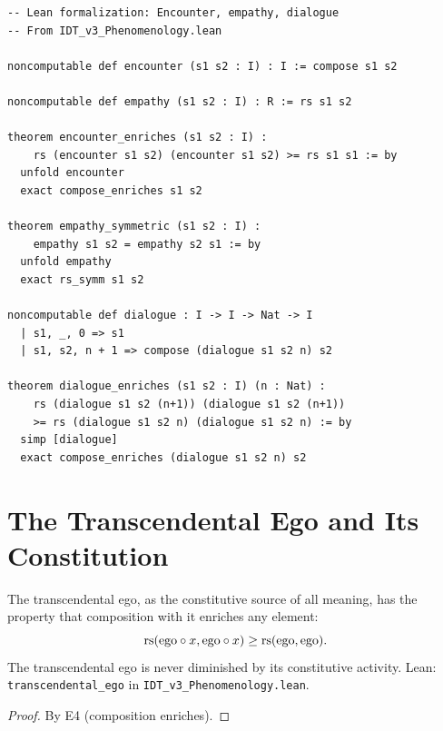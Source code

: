 \begin{lstlisting}
-- Lean formalization: Encounter, empathy, dialogue
-- From IDT_v3_Phenomenology.lean

noncomputable def encounter (s1 s2 : I) : I := compose s1 s2

noncomputable def empathy (s1 s2 : I) : R := rs s1 s2

theorem encounter_enriches (s1 s2 : I) :
    rs (encounter s1 s2) (encounter s1 s2) >= rs s1 s1 := by
  unfold encounter
  exact compose_enriches s1 s2

theorem empathy_symmetric (s1 s2 : I) :
    empathy s1 s2 = empathy s2 s1 := by
  unfold empathy
  exact rs_symm s1 s2

noncomputable def dialogue : I -> I -> Nat -> I
  | s1, _, 0 => s1
  | s1, s2, n + 1 => compose (dialogue s1 s2 n) s2

theorem dialogue_enriches (s1 s2 : I) (n : Nat) :
    rs (dialogue s1 s2 (n+1)) (dialogue s1 s2 (n+1))
    >= rs (dialogue s1 s2 n) (dialogue s1 s2 n) := by
  simp [dialogue]
  exact compose_enriches (dialogue s1 s2 n) s2
\end{lstlisting}





\section{The Transcendental Ego and Its Constitution}

\begin{theorem}
\label{thm:transcendental-ego}
The transcendental ego, as the constitutive source of all meaning, has
the property that composition with it enriches any element:
\[
\mathrm{rs}(\mathrm{ego} \circ x, \mathrm{ego} \circ x) \geq \mathrm{rs}(\mathrm{ego}, \mathrm{ego}).
\]
The transcendental ego is never diminished by its constitutive activity.
Lean: \texttt{transcendental\_ego} in \texttt{IDT\_v3\_Phenomenology.lean}.
\end{theorem}

\begin{proof}
By E4 (composition enriches).
\end{proof}

